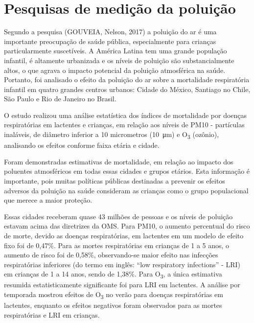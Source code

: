 
\section{Pesquisas de medição da poluição}

Segundo a pesquisa (GOUVEIA, Nelson, 2017) a poluição do ar é uma importante preocupação de saúde 
pública, especialmente para crianças particularmente suscetíveis. A América Latina tem uma grande 
população infantil, é altamente urbanizada e os níveis de poluição são substancialmente altos, o que 
agrava o impacto potencial da poluição atmosférica na saúde. Portanto, foi analisado o efeito da 
poluição do ar sobre a mortalidade respiratória infantil em quatro grandes centros urbanos: Cidade 
do México, Santiago no Chile, São Paulo e Rio de Janeiro no Brasil.

O estudo realizou uma análise estatística dos índices de mortalidade por doenças respiratórias em 
lactentes e crianças, em relação aos níveis de PM10 - partículas inaláveis, de diâmetro inferior a 
10 micrometros (\SI{10}{ \micro\meter }) e O\textsubscript{3} (ozônio), analisando os efeitos conforme faixa etária e 
cidade. 

Foram demonstradas estimativas de mortalidade, em relação ao impacto dos poluentes atmosféricos em 
todas essas cidades e grupos etários. Esta informação é importante, pois muitas políticas públicas 
destinadas a prevenir os efeitos adversos da poluição na saúde consideram as crianças como o grupo 
populacional que merece a maior proteção.

Essas cidades receberam quase 43 milhões de pessoas e os níveis de poluição estavam acima das 
diretrizes da OMS. Para PM10, o aumento percentual do risco de morte, devido as doenças 
respiratórias, em lactentes em um modelo de efeito fixo foi de 0,47\%. Para as mortes respiratórias 
em crianças de 1 a 5 anos, o aumento de risco foi de 0,58\%, observando-se maior efeito nas 
infecções respiratórias inferiores (do termo em inglês: ``low respiratory infections'' - LRI) em 
crianças de 1 a 14 anos, sendo de 1,38\%. Para O\textsubscript{3}, a única estimativa resumida 
estatisticamente significante foi para LRI em lactentes. A análise por temporada mostrou efeitos de 
O\textsubscript{3} no verão para doenças respiratórias em lactentes, enquanto os efeitos negativos 
foram observados para as mortes respiratórias e LRI em crianças.

